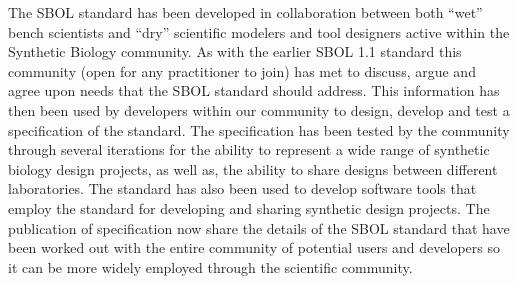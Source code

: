The SBOL standard has been developed in collaboration between both ``wet'' bench scientists and ``dry'' scientific modelers and tool designers active within the Synthetic Biology community. 
As with the earlier SBOL 1.1 standard this community (open for any practitioner to join) has met to discuss, argue and agree upon needs that the SBOL standard should address. 
This information has then been used by developers within our community to design, develop and test a specification of the standard. The specification has been tested by the community through several iterations for the ability to represent a wide range of synthetic biology design projects, as well as, the ability to share designs between different laboratories. 
The standard has also been used to develop software tools that employ the standard for developing and sharing synthetic design projects. 
The publication of specification now share the details of the SBOL standard that have been worked out with the entire community of potential users and developers so it can be more widely employed through the scientific community.